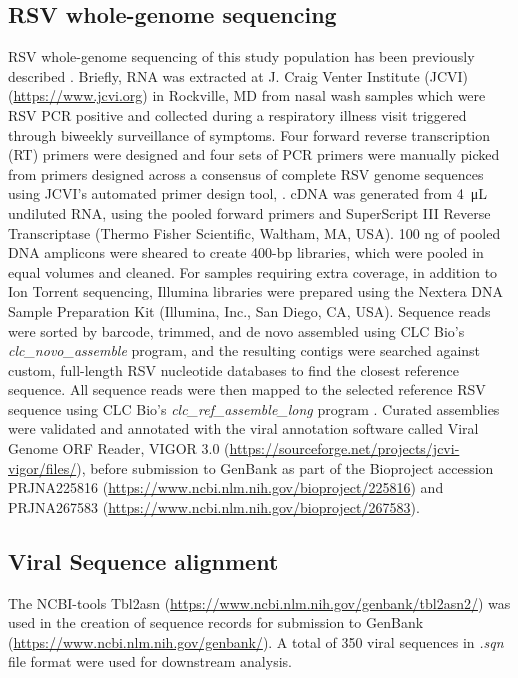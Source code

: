 \documentclass{article}
\begin{document}
\subsection{RSV whole-genome sequencing}
RSV whole-genome sequencing of this study population has been previously described 
\cite{schobel_respiratory_2016}.
Briefly, RNA was extracted at J. Craig Venter Institute (JCVI) (\url{https://www.jcvi.org}) in Rockville, MD from nasal wash samples which were RSV PCR positive and collected during a respiratory illness visit triggered through biweekly surveillance of symptoms. 
Four forward reverse transcription (RT) primers were designed and four sets of PCR primers were manually picked from primers designed across a consensus of complete RSV genome sequences using JCVI’s automated primer design tool,
\cite{li_automated_2012}.
cDNA was generated from \SI{4}{\micro\liter}  undiluted RNA, using the pooled forward primers and SuperScript III Reverse Transcriptase (Thermo Fisher Scientific, Waltham, MA, USA). 
100 ng of pooled DNA amplicons were sheared to create 400-bp libraries, which were pooled in equal volumes and cleaned. 
For samples requiring extra coverage, in addition to Ion Torrent sequencing, Illumina libraries were prepared using the Nextera DNA Sample Preparation Kit (Illumina, Inc., San Diego, CA, USA). 
Sequence reads were sorted by barcode, trimmed, and de novo assembled using CLC Bio's \textit{clc\_novo\_assemble} program, and the resulting contigs were searched against custom, full-length RSV nucleotide databases to find the closest reference sequence. 
All sequence reads were then mapped to the selected reference RSV sequence using CLC Bio's \textit{clc\_ref\_assemble\_long} program 
\cite{bioWhite2016}.
Curated assemblies were validated and annotated with the viral annotation software called Viral Genome ORF Reader, VIGOR 3.0 (\url{https://sourceforge.net/projects/jcvi-vigor/files/}), before submission to GenBank as part of the Bioproject accession PRJNA225816 (\url{https://www.ncbi.nlm.nih.gov/bioproject/225816})
\cite{wang_vigor_2012} 
and PRJNA267583 (\url{https://www.ncbi.nlm.nih.gov/bioproject/267583}).

\subsection{Viral Sequence alignment}
The NCBI-tools Tbl2asn (\url{https://www.ncbi.nlm.nih.gov/genbank/tbl2asn2/})
was used in the creation of sequence records for submission to GenBank (\url{https://www.ncbi.nlm.nih.gov/genbank/}).
A total of 350 viral sequences in \textit{.sqn} file format were used for downstream analysis.
\end{document}
